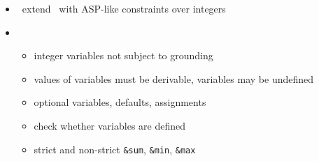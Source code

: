 \begin{frame}{\fclingo}
  \begin{itemize}
  \item {} \ extend \clingo\ with ASP-like constraints over integers
  \item {} \
    \begin{itemize}
    \item integer variables not subject to grounding
    \item values of variables must be derivable, variables may be undefined
    \item optional variables, defaults, assignments
    \item check whether variables are defined
    \item strict and non-strict \lstinline{&sum}, \lstinline{&min}, \lstinline{&max}
    \end{itemize}
  \end{itemize}
\end{frame}
%
